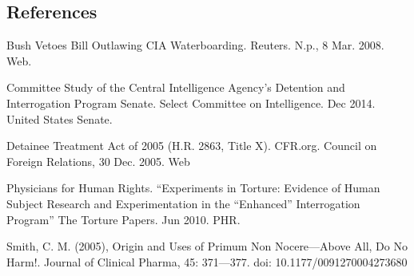 \documentclass{article}
\newcommand{\q}[1]{``#1''}
\begin{document}
\pagebreak
\begin{center}\section*{References}\end{center}

Bush Vetoes Bill Outlawing CIA Waterboarding. Reuters. N.p., 8 Mar. 2008. Web. \par

\vspace{5pt}
Committee Study of the Central Intelligence Agency's Detention and Interrogation Program Senate. Select Committee on Intelligence. Dec 2014. United States Senate. \par

\vspace{5pt}
Detainee Treatment Act of 2005 (H.R. 2863, Title X). CFR.org. Council on Foreign Relations, 30 Dec. 2005. Web \par
\vspace{5pt}

Physicians for Human Rights. \q{Experiments in Torture: Evidence of Human Subject Research and Experimentation in the \q{Enhanced} Interrogation Program} The Torture Papers. Jun 2010. PHR.\par
\vspace{5pt}

Smith, C. M. (2005), Origin and Uses of Primum Non Nocere---Above All, Do No Harm!. Journal of Clinical Pharma, 45: 371---377. doi: 10.1177/0091270004273680\par
\end{document}
